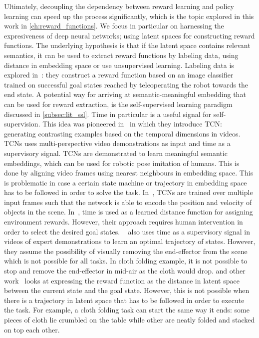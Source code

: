 \documentclass[\home/main.tex]{subfiles}
\begin{document}
Ultimately, decoupling the dependency between reward learning and policy learning can speed up the process significantly, which is the topic explored in this work in \cref{ch:reward_functions}. We focus in particular on harnessing the expresiveness of deep neural networks; using latent spaces for constructing reward functions. The underlying hypothesis is that if the latent space contains relevant semantics, it can be used to extract reward functions by labeling data, using distance in embedding space or use unsupervised learning. Labeling data is explored in~\autocite{Singh2019}: they construct a reward function based on an image classifier trained on successful goal states reached by teleoperating the robot towards the end state. A potential way for arriving at semantic-meaningful embedding that can be used for reward extraction, is the self-supervised learning paradigm discussed in \cref{subsec:lit_ssl}. Time in particular is a useful signal for self-supervision. This idea was pioneered in~\autocite{Sermanet2017TCN} in which they introduce \gls{TCN}: generating contrasting examples based on the temporal dimensions in videos. \glspl{TCN} uses multi-perspective video demonstrations as input and time as a supervisory signal. \Glspl{TCN} are demonstrated to learn meaningful semantic embeddings, which can be used for robotic pose imitation of humans. This is done by aligning video frames using nearest neighbours in embedding space. This is problematic in case a certain state machine or trajectory in embedding space has to be followed in order to solve the task. In~\autocite{Dwibedi2018mfTCN}, TCNs are trained over multiple input frames such that the network is able to encode the position and velocity of objects in the scene. In~\autocite{Hartikainen2019}, time is used as a learned distance function for assigning environment rewards. However, their approach requires human intervention in order to select the desired goal states. ~\autocite{Nair2018time} also uses time as a supervisory signal in videos of expert demonstrations to learn an optimal trajectory of states. However, they assume the possibility of visually removing the end-effector from the scene which is not possible for all tasks. In cloth folding example, it is not possible to stop and remove the end-effector in mid-air as the cloth would drop.
\autocite{Sermanet2017TCN} and other work~\autocite{Nair2018visual} looks at expressing the reward function as the distance in latent space between the current state and the goal state. However, this is not possible when there is a trajectory in latent space that has to be followed in order to execute the task. For example, a cloth folding task can start the same way it ends: some pieces of cloth lie crumbled on the table while other are neatly folded and stacked on top each other.   
\end{document}
